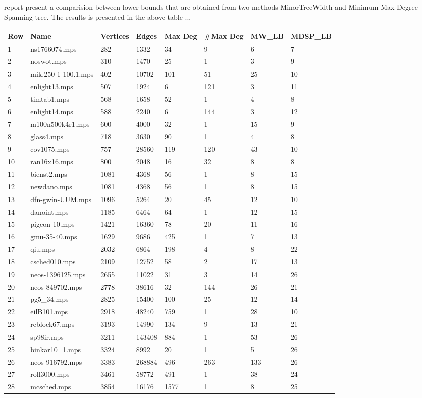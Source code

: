 \documentclass{article}
\begin{document}
\maketitleThis report present a comparision between lower bounds that are obtained from two methods MinorTreeWidth and Minimum Max Degree Spanning tree. The results is presented in the above table ...
\begin{longtable}{|l |l |l |l |l |l |l |l |}
\hline
Row&Name&Vertices&Edges&Max Deg&\#Max Deg&MW_LB&MDSP_LB\\
\hline
1&ns1766074.mps&282&1332&34&9&6&7\\
2&noswot.mps&310&1470&25&1&3&9\\
3&mik.250-1-100.1.mps&402&10702&101&51&25&10\\
4&enlight13.mps&507&1924&6&121&3&11\\
5&timtab1.mps&568&1658&52&1&4&8\\
6&enlight14.mps&588&2240&6&144&3&12\\
7&m100n500k4r1.mps&600&4000&32&1&15&9\\
8&glass4.mps&718&3630&90&1&4&8\\
9&cov1075.mps&757&28560&119&120&43&10\\
10&ran16x16.mps&800&2048&16&32&8&8\\
11&bienst2.mps&1081&4368&56&1&8&15\\
12&newdano.mps&1081&4368&56&1&8&15\\
13&dfn-gwin-UUM.mps&1096&5264&20&45&12&10\\
14&danoint.mps&1185&6464&64&1&12&15\\
15&pigeon-10.mps&1421&16360&78&20&11&16\\
16&gmu-35-40.mps&1629&9686&425&1&7&13\\
17&qiu.mps&2032&6864&198&4&8&22\\
18&csched010.mps&2109&12752&58&2&17&13\\
19&neos-1396125.mps&2655&11022&31&3&14&26\\
20&neos-849702.mps&2778&38616&32&144&26&21\\
21&pg5_34.mps&2825&15400&100&25&12&14\\
22&eilB101.mps&2918&48240&759&1&28&10\\
23&reblock67.mps&3193&14990&134&9&13&21\\
24&sp98ir.mps&3211&143408&884&1&53&26\\
25&binkar10_1.mps&3324&8992&20&1&5&26\\
26&neos-916792.mps&3383&268884&496&263&133&26\\
27&roll3000.mps&3461&58772&491&1&38&24\\
28&mcsched.mps&3854&16176&1577&1&8&25\\

\end{longtable}
\end{document}
